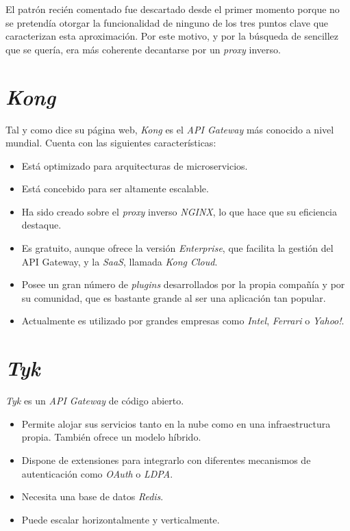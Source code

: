 \documentclass[11pt,spanish,listoffigures]{tfgetsinf}
\begin{document}
El patrón recién comentado fue descartado desde el primer momento porque no se pretendía otorgar la funcionalidad de ninguno de los tres puntos clave que caracterizan esta aproximación. Por este motivo, y por la búsqueda de sencillez que se quería, era más coherente decantarse por un \emph{proxy} inverso.

\section{\emph{Kong}}
Tal y como dice su página web, \emph{Kong} \cite{Kong} es el \emph{API Gateway} más conocido a nivel mundial. Cuenta con las siguientes características:

\begin{itemize}

\item Está optimizado para arquitecturas de microservicios.
\item Está concebido para ser altamente escalable.
\item Ha sido creado sobre el \emph{proxy} inverso \emph{NGINX}, lo que hace que su eficiencia destaque.
\item Es gratuito, aunque ofrece la versión \emph{Enterprise}, que facilita la gestión del API Gateway, y la \emph{SaaS}, llamada \emph{Kong Cloud}.
\item Posee un gran número de \emph{plugins} desarrollados por la propia compañía y por su comunidad, que es bastante grande al ser una aplicación tan popular.
\item Actualmente es utilizado por grandes empresas como \emph{Intel}, \emph{Ferrari} o \emph{Yahoo!}.

\end{itemize}

\section{\emph{Tyk}}
\emph{Tyk} \cite{Tyk} es un \emph{API Gateway} de código abierto.

\begin{itemize}

\item Permite alojar sus servicios tanto en la nube como en una infraestructura propia. También ofrece un modelo híbrido.
\item Dispone de extensiones para integrarlo con diferentes mecanismos de autenticación como \emph{OAuth} o \emph{LDPA}.
\item Necesita una base de datos \emph{Redis}.
\item Puede escalar horizontalmente y verticalmente.

\end{itemize}
\end{document}
